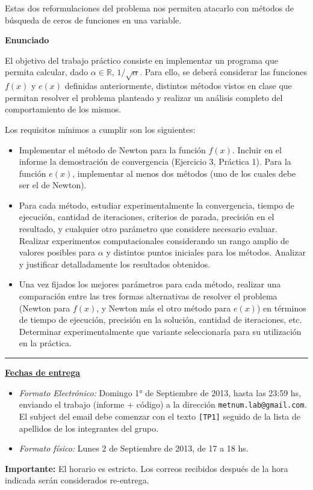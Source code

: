Estas dos reformulaciones del problema nos permiten atacarlo con m\'etodos de b\'usqueda de ceros de funciones en una
variable.

\textbf{Enunciado}

El objetivo del trabajo pr\'actico consiste en implementar un programa que permita calcular, dado $\alpha \in
\mathbb{R}$, $1/\sqrt{\alpha}$. Para ello, se deber\'a considerar las funciones $f(x)$ y $e(x)$ definidas
anteriormente, distintos m\'etodos vistos en clase que permitan resolver el problema planteado y realizar un an\'alisis
completo del comportamiento de los mismos. 

Los requisitos m\'inimos a cumplir son los siguientes:

\begin{itemize}
\item Implementar el m\'etodo de Newton para la funci\'on $f(x)$. Incluir en el informe la demostraci\'on de
convergencia (Ejercicio 3, Pr\'actica 1). Para la funci\'on $e(x)$, implementar al menos dos m\'etodos (uno de los
cuales debe ser el de Newton).   
\item Para cada m\'etodo, estudiar experimentalmente la convergencia, tiempo de ejecuci\'on, cantidad de iteraciones,
criterios de parada, precisi\'on en el resultado, y cualquier otro par\'ametro que considere necesario evaluar. Realizar experimentos
computacionales considerando un rango amplio de valores posibles para $\alpha$ y distintos puntos iniciales
para los m\'etodos. Analizar y justificar detalladamente los resultados obtenidos.
\item Una vez fijados los mejores par\'ametros para cada m\'etodo, realizar una comparaci\'on entre las tres formas
alternativas de resolver el problema (Newton para $f(x)$, y Newton m\'as el otro m\'etodo para $e(x)$) en t\'erminos de
tiempo de ejecuci\'on, precisi\'on en la soluci\'on, cantidad de iteraciones, etc. Determinar experimentalmente que
variante seleccionar\'ia para su utilizaci\'on en la pr\'actica.
\end{itemize}

\vskip 15pt

\hrule

\vskip 11pt


{\bf \underline{Fechas de entrega}}
\begin{itemize}
 \item \emph{Formato Electr\'onico:} Domingo 1° de Septiembre de 2013, hasta las 23:59 hs, enviando el trabajo (informe +
 c\'odigo) a la direcci\'on \verb+metnum.lab@gmail.com+. El subject del email debe comenzar con el texto \verb+[TP1]+
 seguido de la lista de apellidos  de los integrantes del grupo.
 \item \emph{Formato f\'isico:} Lunes 2 de Septiembre de 2013, de 17 a 18 hs.
\end{itemize}

\noindent \textbf{Importante:} El horario es estricto. Los correos recibidos despu\'es de la hora indicada ser\'an considerados re-entrega.
